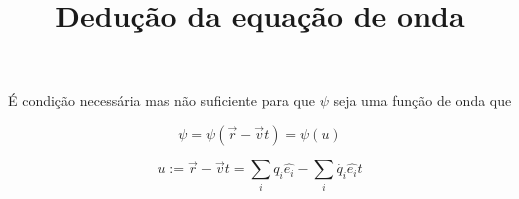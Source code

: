 \documentclass{article}
\title{Dedução da equação de onda}
\author{}
\date{}
\newcommand{\braces}[1]{\left ( #1 \right )}
\newcommand{\position}[0]{\vec{r}}
\newcommand{\velocity}[0]{\vec{v}}
\newcommand{\versor}[1]{\hat{e_{#1}}}
\begin{document}
\maketitle
É condição necessária mas não suficiente para que $\psi$ seja uma função
de onda que

$$\psi = \psi \braces{\position - \velocity t} = \psi \braces{u}$$

$$u := \position - \velocity t = \sum_i q_i \versor{i} - \sum_i \dot{q_i} \versor{i} t$$

\begin{gather*}
\\
\end{gather*}
\end{document}
